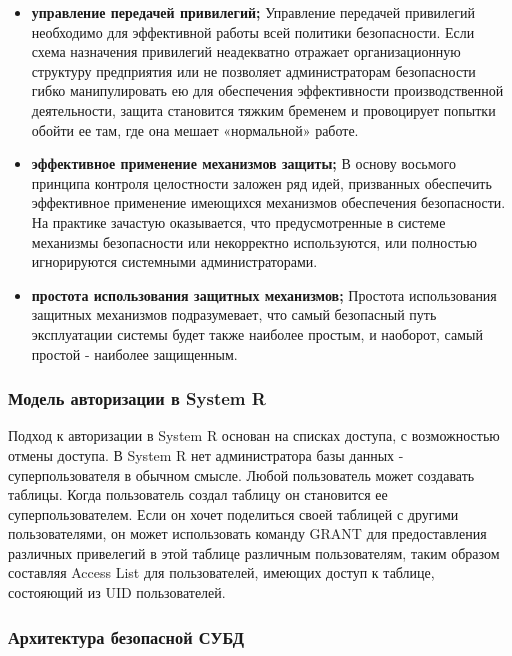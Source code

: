 \begin{itemize}
    на переплавку. В связи с этим Кларк и Вильсон указывают на необходимость регулярных проверок,
    целью которых является выявление возможных несоответствий между защищаемыми данными и объективной
    реальностью, которую они отражают.
    \item \textbf{управление передачей привилегий;}
    Управление передачей привилегий необходимо для эффективной работы всей политики безопасности.
    Если схема назначения привилегий неадекватно отражает организационную структуру предприятия или
    не позволяет администраторам безопасности гибко манипулировать ею для обеспечения эффективности
    производственной деятельности, защита становится тяжким бременем и провоцирует попытки обойти ее
    там, где она мешает «нормальной» работе.
    \item \textbf{эффективное применение механизмов защиты;}
    В основу восьмого принципа контроля целостности заложен ряд идей, призванных обеспечить эффективное
    применение имеющихся механизмов обеспечения безопасности. На практике зачастую оказывается, что
    предусмотренные в системе механизмы безопасности или некорректно используются, или полностью
    игнорируются системными администраторами.
    \item \textbf{простота использования защитных механизмов;}
    Простота использования защитных механизмов подразумевает, что самый безопасный путь эксплуатации системы
    будет также наиболее простым, и наоборот, самый простой - наиболее защищенным.
\end{itemize}

\subsubsection{Модель авторизации в System R}
Подход к авторизации в System R основан на списках доступа, с возможностью отмены доступа.
В System R нет администратора базы данных - суперпользователя в обычном смысле. Любой пользователь может создавать таблицы.
Когда пользователь создал таблицу он становится ее суперпользователем.
Если он хочет поделиться своей таблицей с другими пользователями, он может использовать команду GRANT для
предоставления различных привелегий в этой таблице различным пользователям, таким образом составляя
Access List для пользователей, имеющих доступ к таблице, состояющий из UID пользователей.
\subsubsection{Архитектура безопасной СУБД}

